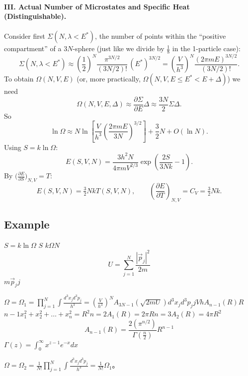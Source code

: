 \paragraph{III. Actual Number of Microstates and Specific Heat (Distinguishable).}
Consider first $\Sigma(N,\lambda<E^{*})$, the number of points within the ``positive compartment'' of a $3N$-sphere (just like we divide by $\frac{1}{8}$ in the 1-particle case):
\[
    \Sigma(N,\lambda<E^{*}) \approx \left(\frac{1}{2}\right)^{N}\frac{\pi^{3N/2}}{(3N/2)!}\,(E^{*})^{3N/2}
    = \left(\frac{V}{h^{3}}\right)^{N}\frac{(2\pi m E)^{3N/2}}{(3N/2)!}.
\]
To obtain $\Omega(N,V,E)$ (or, more practically, $\Omega(N,V, E\le E^{*}<E+\Delta)$) we need
\[
    \Omega(N,V,E,\Delta) \approx \frac{\partial\Sigma}{\partial E}\Delta \approx \frac{3N}{2}\Sigma\Delta.
\]
So
\[
    \boxed{\ln\Omega \approx N\ln\!\left[\frac{V}{h^{3}}\!\left(\frac{2\pi mE}{3N}\right)^{3/2}\right] + \frac{3}{2}N + O(\ln N).}
\]
Using $S=k\ln\Omega$:
\[
    E(S,V,N) = \frac{3 h^{2} N}{4\pi m V^{2/3}}\exp\!\left(\frac{2S}{3Nk}-1\right).
\]
By $\bigl(\frac{\partial E}{\partial S}\bigr)_{N,V} = T$:
\[
    E(S,V,N) = \tfrac{3}{2} N k T(S,V,N), \qquad
    \left(\frac{\partial E}{\partial T}\right)_{N,V} = \boxed{C_V = \tfrac{3}{2} N k}.
\]

\subsection{Example}

$S=k \ln \Omega$ $S$ $k$$\Omega$$N$
\[ U=\sum_{j=1}^{N}\frac{|\vec{p}_{j}|^{2}}{2m} \]
$m$$\vec{p}_{j}$$j$

$\Omega=\Omega_{1}=\prod_{j=1}^{N}\int\frac{d^{3}x_{j}d^{3}p_{j}}{h^{3}}=\left(\frac{V}{h^{3}}\right)^{N}A_{3N-1}(\sqrt{2mU})$$d^{3}x_{j}d^{3}p_{j}$$j$$V$$h$$A_{n-1}(R)$$R$$n-1$$x_{1}^{2}+x_{2}^{2}+\dots+x_{n}^{2}=R^{2}$$n=2$$A_{1}(R)=2\pi R$$n=3$$A_{2}(R)=4\pi R^{2}$
\[ A_{n-1}(R)=\frac{2(\pi^{n/2})}{\Gamma(\frac{n}{2})}R^{n-1} \]
$\Gamma(z)=\int_{0}^{\infty}x^{z-1}e^{-x}dx$

$\Omega=\Omega_{2}=\frac{1}{N!}\prod_{j=1}^{N}\int\frac{d^{3}x_{j}d^{3}p_{j}}{h^{3}}=\frac{1}{N!}\Omega_{1}$。

